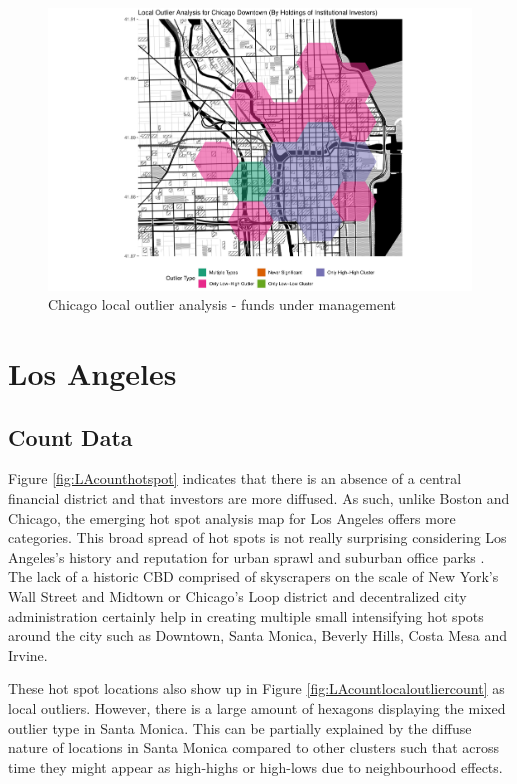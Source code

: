 \begin{figure}
	\centering
	\includegraphics[width=1\linewidth]{Figures/ChapterIV/Chi_Money_LO_Downtown}
	\caption[Downtown Chicago Local Outlier Analysis - Funds Under Management 2013-2018]{Chicago local outlier analysis - funds under management}
	\label{fig:Chicagolocaloutlier_Downtown}
\end{figure}

\section{Los Angeles}



\subsection{Count Data}

Figure \ref{fig:LAcounthotspot} indicates that there is an absence of a central financial district and that investors are more diffused.	As such, unlike Boston and Chicago, the emerging hot spot analysis map for Los Angeles offers more categories.  This broad spread of hot spots is not really surprising considering Los Angeles's history and reputation for urban sprawl and suburban office parks \citep{dearpostmodern1998,harrisconstructing1998}.  The lack of a historic CBD comprised of skyscrapers on the scale of New York's Wall Street and Midtown or Chicago's Loop district and decentralized city administration certainly help in creating multiple small intensifying hot spots around the city such as Downtown, Santa Monica, Beverly Hills, Costa Mesa and Irvine. 

These hot spot locations also show up in Figure \ref{fig:LAcountlocaloutliercount} as local outliers.  However, there is a large amount of hexagons displaying the mixed outlier type in Santa Monica.  This can be partially explained by the diffuse nature of locations in Santa Monica compared to other clusters such that across time they might appear as high-highs or high-lows due to neighbourhood effects.  

